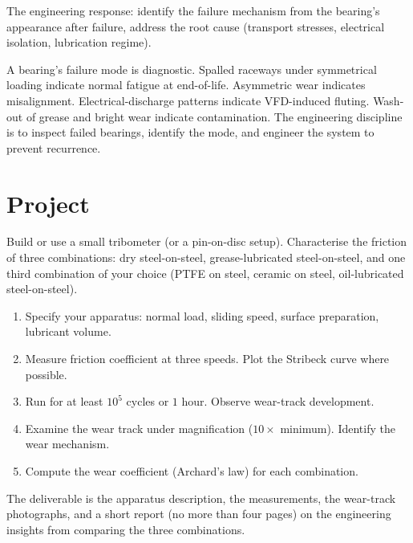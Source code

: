 The engineering response: identify the failure mechanism from the bearing's appearance after failure, address the root cause (transport stresses, electrical isolation, lubrication regime).

\begin{principle}
A bearing's failure mode is diagnostic. Spalled raceways under symmetrical loading indicate normal fatigue at end-of-life. Asymmetric wear indicates misalignment. Electrical-discharge patterns indicate VFD-induced fluting. Wash-out of grease and bright wear indicate contamination. The engineering discipline is to inspect failed bearings, identify the mode, and engineer the system to prevent recurrence.
\end{principle}

\section{Project}

\begin{project}
Build or use a small tribometer (or a pin-on-disc setup). Characterise the friction of three combinations: dry steel-on-steel, grease-lubricated steel-on-steel, and one third combination of your choice (PTFE on steel, ceramic on steel, oil-lubricated steel-on-steel).

\begin{enumerate}[leftmargin=*]
  \item Specify your apparatus: normal load, sliding speed, surface preparation, lubricant volume.
  \item Measure friction coefficient at three speeds. Plot the Stribeck curve where possible.
  \item Run for at least $10^5$ cycles or $1$ hour. Observe wear-track development.
  \item Examine the wear track under magnification ($10\times$ minimum). Identify the wear mechanism.
  \item Compute the wear coefficient (Archard's law) for each combination.
\end{enumerate}

The deliverable is the apparatus description, the measurements, the wear-track photographs, and a short report (no more than four pages) on the engineering insights from comparing the three combinations.
\end{project}

